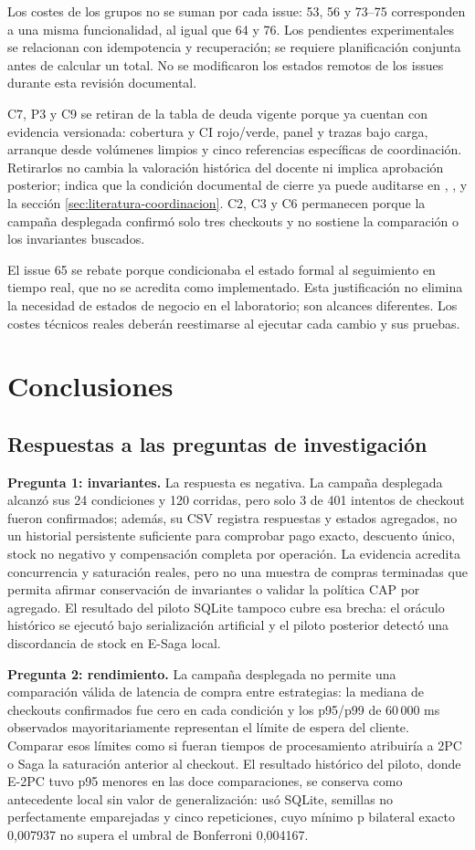 \documentclass[12pt,a4paper]{article}
\newcommand{\seccion}[1]{\section{#1}}
\begin{document}
Los costes de los grupos no se suman por cada issue: 53, 56 y 73--75 corresponden a una misma funcionalidad, al igual que 64 y 76. Los pendientes experimentales se relacionan con idempotencia y recuperación; se requiere planificación conjunta antes de calcular un total. No se modificaron los estados remotos de los issues durante esta revisión documental.

C7, P3 y C9 se retiran de la tabla de deuda vigente porque ya cuentan con evidencia versionada: cobertura y CI rojo/verde, panel y trazas bajo carga, arranque desde volúmenes limpios y cinco referencias específicas de coordinación. Retirarlos no cambia la valoración histórica del docente ni implica aprobación posterior; indica que la condición documental de cierre ya puede auditarse en , ,  y la sección \ref{sec:literatura-coordinacion}. C2, C3 y C6 permanecen porque la campaña desplegada confirmó solo tres checkouts y no sostiene la comparación o los invariantes buscados.

El issue 65 se rebate porque condicionaba el estado formal al seguimiento en tiempo real, que no se acredita como implementado. Esta justificación no elimina la necesidad de estados de negocio en el laboratorio; son alcances diferentes. Los costes técnicos reales deberán reestimarse al ejecutar cada cambio y sus pruebas.

\seccion{Conclusiones}
\subsection{Respuestas a las preguntas de investigación}
\textbf{Pregunta 1: invariantes.} La respuesta es negativa. La campaña desplegada alcanzó sus 24 condiciones y 120 corridas, pero solo 3 de 401 intentos de checkout fueron confirmados; además, su CSV registra respuestas y estados agregados, no un historial persistente suficiente para comprobar pago exacto, descuento único, stock no negativo y compensación completa por operación. La evidencia acredita concurrencia y saturación reales, pero no una muestra de compras terminadas que permita afirmar conservación de invariantes o validar la política CAP por agregado. El resultado del piloto SQLite tampoco cubre esa brecha: el oráculo histórico se ejecutó bajo serialización artificial y el piloto posterior detectó una discordancia de stock en E-Saga local.

\textbf{Pregunta 2: rendimiento.} La campaña desplegada no permite una comparación válida de latencia de compra entre estrategias: la mediana de checkouts confirmados fue cero en cada condición y los p95/p99 de 60\,000 ms observados mayoritariamente representan el límite de espera del cliente. Comparar esos límites como si fueran tiempos de procesamiento atribuiría a 2PC o Saga la saturación anterior al checkout. El resultado histórico del piloto, donde E-2PC tuvo p95 menores en las doce comparaciones, se conserva como antecedente local sin valor de generalización: usó SQLite, semillas no perfectamente emparejadas y cinco repeticiones, cuyo mínimo p bilateral exacto 0,007937 no supera el umbral de Bonferroni 0,004167.
\end{document}
